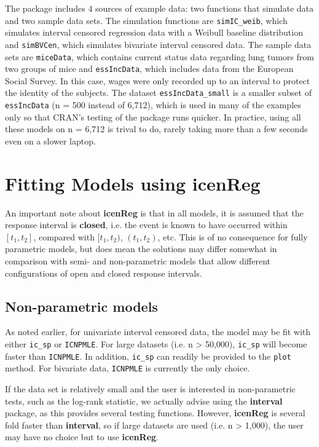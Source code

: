 \documentclass[11pt]{report}
\begin{document}
  The package includes 4 sources of example data: two functions that simulate data and
  two sample data sets. The simulation functions are \texttt{simIC\_weib}, which simulates
  interval censored regression data with a Weibull baseline distribution and 
  \texttt{simBVCen}, which simulates bivariate interval censored data. The sample data sets
  are \texttt{miceData}, which contains current status data regarding lung tumors 
  from two groups of mice and \texttt{essIncData}, which includes data from the European
  Social Survey. In this case, wages were only recorded up to an interval to 
  protect the identity of the subjects. The dataset \texttt{essIncData\_small} is a smaller
  subset of \texttt{essIncData} (n = 500 instead of 6,712), which is used in many of 
  the examples only so that CRAN's testing of the package runs quicker. In practice,
  using all these models on n = 6,712 is trival to do, rarely taking more than a few seconds
  even on a slower laptop. 
  
  
  \chapter{Fitting Models using {\bf{icenReg}} }
  
  An important note about {\bf icenReg} is that in all models, it is assumed that the 
  response interval is {\bf closed}, i.e. the event is known to have occurred within 
  $[t_1, t_2]$, compared with $[t_1, t_2)$, $(t_1, t_2)$, etc. This is of no consequence 
  for fully parametric models, but does mean the solutions may differ somewhat in 
  comparison with semi- and non-parametric models that allow different configurations
  of open and closed response intervals. 
  
  \section{Non-parametric models}
  
  As noted earlier, for univariate interval censored data, the model may be fit with either
  \texttt{ic\_sp} or \texttt{ICNPMLE}. For large datasets (i.e. n > 50,000), \texttt{ic\_sp} 
  will become faster than \texttt{ICNPMLE}. In addition, \texttt{ic\_sp} can readily be 
  provided to the \texttt{plot} method. For bivariate data, \texttt{ICNPMLE} is currently
  the only choice. 
  
  If the data set is relatively small and the user is interested in non-parametric tests,
  such as the log-rank statistic, we actually advise using the {\bf interval} package,
  as this provides several testing functions. However, {\bf icenReg} is several fold 
  faster than {\bf interval}, so if large datasets are used (i.e. n > 1,000), the user
  may have no choice but to use {\bf icenReg}.
  
\end{document}
